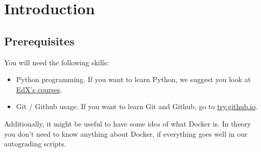 \section{Introduction}

\subsection{Prerequisites}

You will need the following skills:

\begin{itemize}
  \item Python programming. If you want to learn Python, we suggest you look at
  \href{https://www.edx.org/learn/python}{EdX's courses}.
  \item Git / Github usage. If you want to learn Git and Github, go to \href{https://try.github.io/}{try.github.io}.
 \end{itemize}

Additionally, it might be useful to have some idea of what Docker is. In theory you don't need to know anything about Docker, if everything goes well in our autograding scripts.



